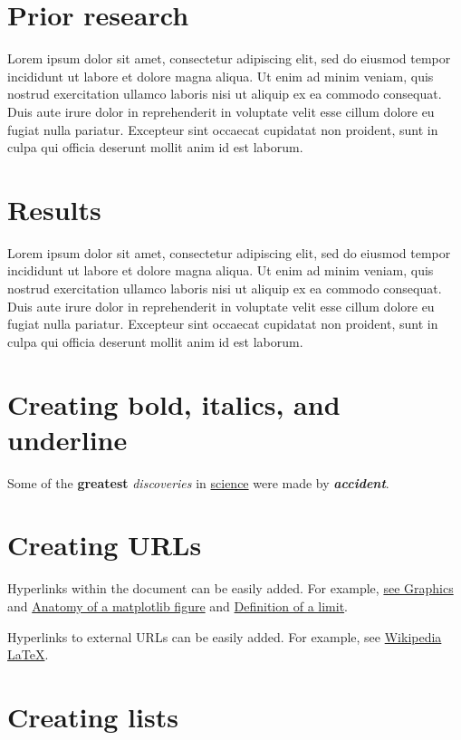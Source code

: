 \documentclass[10pt, letterpaper, twoside]{article}
\begin{document}
\section{Prior research}\label{sec:prior_research}
Lorem ipsum dolor sit amet, consectetur adipiscing elit, sed do eiusmod tempor incididunt ut labore et dolore magna aliqua. Ut enim ad minim veniam, quis nostrud exercitation ullamco laboris nisi ut aliquip ex ea commodo consequat. Duis aute irure dolor in reprehenderit in voluptate velit esse cillum dolore eu fugiat nulla pariatur. Excepteur sint occaecat cupidatat non proident, sunt in culpa qui officia deserunt mollit anim id est laborum.

\section{Results}\label{sec:results}

Lorem ipsum dolor sit amet, consectetur adipiscing elit, sed do eiusmod tempor incididunt ut labore et dolore magna aliqua. Ut enim ad minim veniam, quis nostrud exercitation ullamco laboris nisi ut aliquip ex ea commodo consequat. Duis aute irure dolor in reprehenderit in voluptate velit esse cillum dolore eu fugiat nulla pariatur. Excepteur sint occaecat cupidatat non proident, sunt in culpa qui officia deserunt mollit anim id est laborum.

\section{Creating bold, italics, and underline}\label{sec:bold_italics_underline}
Some of the \textbf{greatest} \textit{discoveries} in \underline{science} were made by \textbf{\textit{accident}}.

\section{Creating URLs}\label{sec:urls}
Hyperlinks within the document can be easily added. For example, \hyperref[sec:graphics]{see Graphics} and \hyperref[fig:anatomy_of_a_matplotlib_figure]{Anatomy of a matplotlib figure} and \hyperref[def:limit]{Definition of a limit}.

Hyperlinks to external URLs can be easily added. For example, see \href{https://en.wikipedia.org/wiki/Latex}{Wikipedia \LaTeX}.

\newpage
\section{Creating lists}\label{sec:lists}
\end{document}
